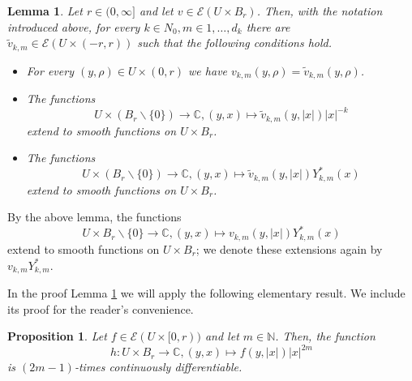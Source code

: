 \documentclass[a4paper,10pt]{amsart}
\newtheorem{lemma}[theorem]{Lemma}
\newtheorem{proposition}[theorem]{Proposition}
\newtheorem*{crucial lemma}{Lemma \ref{lem:nice polynomial2}}
\theoremstyle{definition}
\newcommand{\C}{\mathbb{C}}
\newcommand{\N}{\mathbb{N}}
\begin{document}
\begin{lemma}\label{lemma:spherical harmonics expansion}
	Let $r\in(0,\infty]$ and let $v\in\mathscr{E}(U\times B_r)$. Then, with the notation introduced above, for every $k\in N_0, m\in {1,\ldots, d_k}$ there are $\tilde{v}_{k,m}\in\mathscr{E}(U\times (-r,r))$ such that the following conditions hold.
	\begin{itemize}
		\item[(i)] For every $(y,\rho)\in U\times (0,r)$ we have $v_{k,m}(y,\rho)=\tilde{v}_{k,m}(y,\rho)$.
		\item[(ii)] The functions
		\[U\times (B_r\backslash\{0\})\rightarrow\C,(y,x)\mapsto \tilde{v}_{k,m}(y,|x|) |x|^{-k}\]
		extend to smooth functions on $U\times B_r$. 
 		\item[(iii)] The functions
		\[U\times (B_r\backslash\{0\})\rightarrow\C,(y,x)\mapsto \tilde{v}_{k,m}(y,|x|)Y_{k,m}^*(x)\]
		extend to smooth functions on $U\times B_r$. 
	\end{itemize}
\end{lemma}

By the above lemma, the functions
\[U\times B_r\backslash\{0\}\rightarrow\C,(y,x)\mapsto  v_{k,m}(y,|x|)Y^*_{k,m}(x)\]
extend to smooth functions on $U\times B_r$; we denote these extensions again by $v_{k,m}Y^*_{k,m}$.

In the proof Lemma \ref{lemma:spherical harmonics expansion} we will apply the following elementary result. We include its proof for the reader's convenience.

\begin{proposition}\label{prop:regularity of factor}
	Let $f\in \mathscr{E}(U\times [0,r))$ and let $m\in\N$. Then, the function
	\[h:U\times B_r\rightarrow\C,(y,x)\mapsto f(y,|x|)|x|^{2m}\]
	is $(2m-1)$-times continuously differentiable.
\end{proposition}
\end{document}
